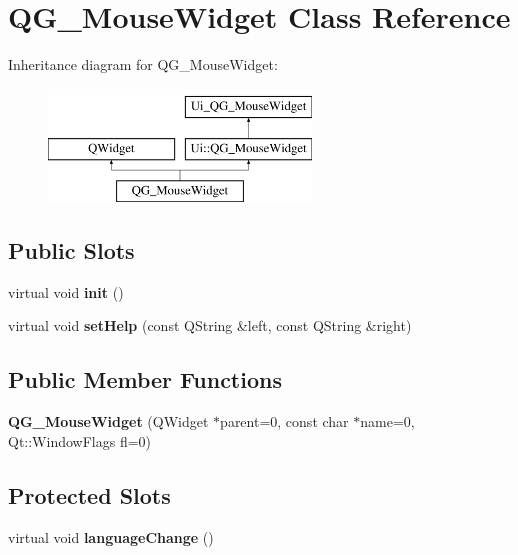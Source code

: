 \hypertarget{classQG__MouseWidget}{\section{Q\-G\-\_\-\-Mouse\-Widget Class Reference}
\label{classQG__MouseWidget}
}
Inheritance diagram for Q\-G\-\_\-\-Mouse\-Widget\-:\begin{figure}[H]
\begin{center}
\leavevmode
\includegraphics[height=3.000000cm]{classQG__MouseWidget}
\end{center}
\end{figure}
\subsection*{Public Slots}
\begin{DoxyCompactItemize}
\item 
\hypertarget{classQG__MouseWidget_a96439db5a3e54af3acbef4c548ae0afd}{virtual void {\bfseries init} ()}\label{classQG__MouseWidget_a96439db5a3e54af3acbef4c548ae0afd}

\item 
\hypertarget{classQG__MouseWidget_a7c961077d013e2b0b348115f5b15de6b}{virtual void {\bfseries set\-Help} (const Q\-String \&left, const Q\-String \&right)}\label{classQG__MouseWidget_a7c961077d013e2b0b348115f5b15de6b}

\end{DoxyCompactItemize}
\subsection*{Public Member Functions}
\begin{DoxyCompactItemize}
\item 
\hypertarget{classQG__MouseWidget_a442eeafc7931d33d1dd1147e56c4e4fd}{{\bfseries Q\-G\-\_\-\-Mouse\-Widget} (Q\-Widget $\ast$parent=0, const char $\ast$name=0, Qt\-::\-Window\-Flags fl=0)}\label{classQG__MouseWidget_a442eeafc7931d33d1dd1147e56c4e4fd}

\end{DoxyCompactItemize}
\subsection*{Protected Slots}
\begin{DoxyCompactItemize}
\item 
\hypertarget{classQG__MouseWidget_ac7433845baf07c61e1b22dd3db220366}{virtual void {\bfseries language\-Change} ()}\label{classQG__MouseWidget_ac7433845baf07c61e1b22dd3db220366}

\end{DoxyCompactItemize}
